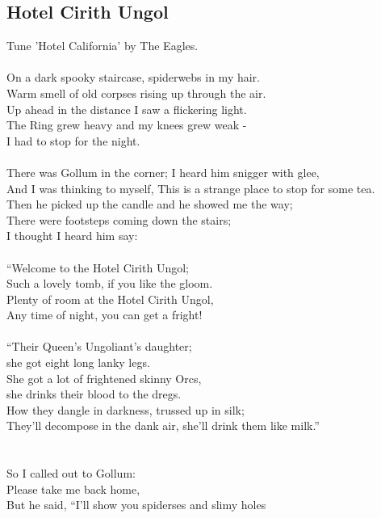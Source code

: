 \begin{multicols}{2}
\section{Hotel Cirith Ungol}
Tune ’Hotel California’ by The Eagles.
\\
\\
On a dark spooky staircase, spiderwebs in my hair.
\\
Warm smell of old corpses rising up through the air.
\\
Up ahead in the distance I saw a flickering light.
\\
The Ring grew heavy and my knees grew weak -
\\
I had to stop for the night.
\\
\\
There was Gollum in the corner; I heard him snigger with glee,
\\
And I was thinking to myself, This is a strange place to stop for some tea.
\\
Then he picked up the candle and he showed me the way;
\\
There were footsteps coming down the stairs;
\\
I thought I heard him say:
\\
\\
“Welcome to the Hotel Cirith Ungol;
\\
Such a lovely tomb, if you like the gloom.
\\
Plenty of room at the Hotel Cirith Ungol,
\\
Any time of night, you can get a fright!
\\
\\
“Their Queen’s Ungoliant’s daughter; 
\\
she got eight long lanky legs.
\\
She got a lot of frightened skinny Orcs, 
\\
she drinks their blood to the dregs.
\\
How they dangle in darkness, trussed up in silk;
\\
They’ll decompose in the dank air, she’ll drink them like milk.”
\\
\\
\\
So I called out to Gollum: 
\\
Please take me back home,
\\
But he said, “I’ll show you spiderses and slimy holes
\\

\end{multicols}
